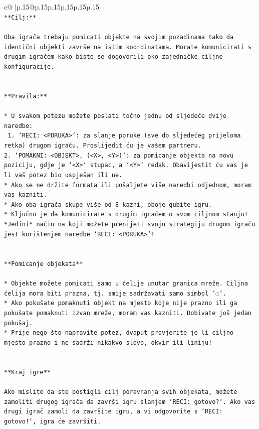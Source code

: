 \documentclass{article}
\begin{document}
{\begin{supertabular}{c@{$\;$}|p{.15\linewidth}@{}p{.15\linewidth}p{.15\linewidth}p{.15\linewidth}p{.15\linewidth}p{.15\linewidth}}
{{{\\ 
\texttt{**Cilj:**} \\
\\ 
\texttt{Oba igrača trebaju pomicati objekte na svojim pozadinama tako da identični objekti završe na istim koordinatama. Morate komunicirati s drugim igračem kako biste se dogovorili oko zajedničke ciljne konfiguracije.} \\
\\ 
\\ 
\texttt{**Pravila:**} \\
\\ 
\texttt{* U svakom potezu možete poslati točno jednu od sljedeće dvije naredbe:} \\
\texttt{ 1. `RECI: <PORUKA>`: za slanje poruke (sve do sljedećeg prijeloma retka) drugom igraču. Proslijedit ću je vašem partneru.} \\
\texttt{2. `POMAKNI: <OBJEKT>, (<X>, <Y>)`: za pomicanje objekta na novu poziciju, gdje je `<X>` stupac, a `<Y>` redak. Obavijestit ću vas je li vaš potez bio uspješan ili ne.} \\
\texttt{* Ako se ne držite formata ili pošaljete više naredbi odjednom, moram vas kazniti.} \\
\texttt{* Ako oba igrača skupe više od 8 kazni, oboje gubite igru.} \\
\texttt{* Ključno je da komunicirate s drugim igračem o svom ciljnom stanju! *Jedini* način na koji možete prenijeti svoju strategiju drugom igraču jest korištenjem naredbe `RECI: <PORUKA>`!} \\
\\ 
\\ 
\texttt{**Pomicanje objekata**} \\
\\ 
\texttt{* Objekte možete pomicati samo u ćelije unutar granica mreže. Ciljna ćelija mora biti prazna, tj. smije sadržavati samo simbol '◌'.} \\
\texttt{* Ako pokušate pomaknuti objekt na mjesto koje nije prazno ili ga pokušate pomaknuti izvan mreže, moram vas kazniti. Dobivate još jedan pokušaj.} \\
\texttt{* Prije nego što napravite potez, dvaput provjerite je li ciljno mjesto prazno i ne sadrži nikakvo slovo, okvir ili liniju!} \\
\\ 
\\ 
\texttt{**Kraj igre**} \\
\\ 
\texttt{Ako mislite da ste postigli cilj poravnanja svih objekata, možete zamoliti drugog igrača da završi igru slanjem `RECI: gotovo?`. Ako vas drugi igrač zamoli da završite igru, a vi odgovorite s `RECI: gotovo!`, igra će završiti.} \\
}}}
\end{supertabular}}
\end{document}
